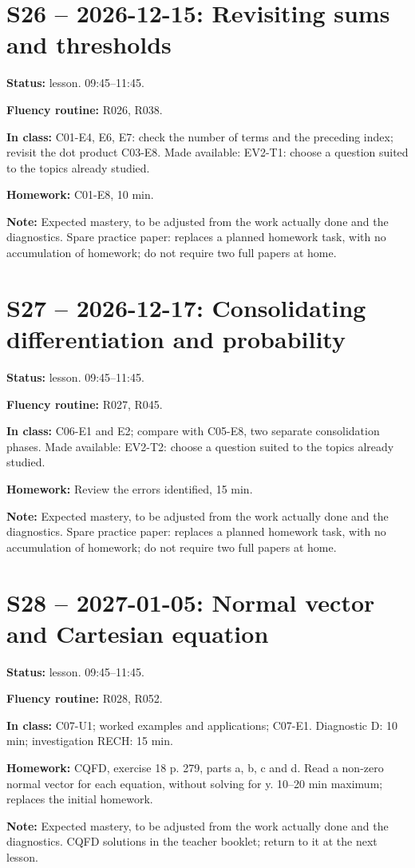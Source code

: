 \section*{S26 -- 2026-12-15: Revisiting sums and thresholds}
\textbf{Status:} lesson. 09:45–11:45.\par\textbf{Fluency routine:} R026, R038.\par\textbf{In class:} C01-E4, E6, E7: check the number of terms and the preceding index; revisit the dot product C03-E8. Made available: EV2-T1: choose a question suited to the topics already studied.\par\textbf{Homework:} C01-E8, 10 min.\par\textbf{Note:} Expected mastery, to be adjusted from the work actually done and the diagnostics. Spare practice paper: replaces a planned homework task, with no accumulation of homework; do not require two full papers at home.
\section*{S27 -- 2026-12-17: Consolidating differentiation and probability}
\textbf{Status:} lesson. 09:45–11:45.\par\textbf{Fluency routine:} R027, R045.\par\textbf{In class:} C06-E1 and E2; compare with C05-E8, two separate consolidation phases. Made available: EV2-T2: choose a question suited to the topics already studied.\par\textbf{Homework:} Review the errors identified, 15 min.\par\textbf{Note:} Expected mastery, to be adjusted from the work actually done and the diagnostics. Spare practice paper: replaces a planned homework task, with no accumulation of homework; do not require two full papers at home.
\section*{S28 -- 2027-01-05: Normal vector and Cartesian equation}
\textbf{Status:} lesson. 09:45–11:45.\par\textbf{Fluency routine:} R028, R052.\par\textbf{In class:} C07-U1; worked examples and applications; C07-E1. Diagnostic D: 10 min; investigation RECH: 15 min.\par\textbf{Homework:} CQFD, exercise 18 p. 279, parts a, b, c and d. Read a non-zero normal vector for each equation, without solving for y. 10–20 min maximum; replaces the initial homework.\par\textbf{Note:} Expected mastery, to be adjusted from the work actually done and the diagnostics. CQFD solutions in the teacher booklet; return to it at the next lesson.
